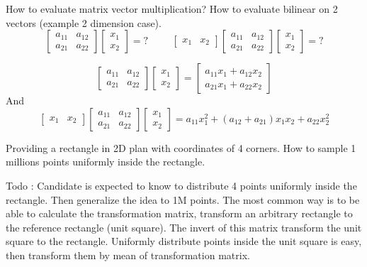 \documentclass[answers]{exam}
\begin{document}
\begin{questions}
\question How to evaluate matrix vector multiplication? How to evaluate bilinear on 2 vectors (example 2 dimension case).
\[
\left[ 
\begin{array}{cc}
a_{11} & a_{12}\\
a_{21} & a_{22}
\end{array} 
\right]
\left[ 
\begin{array}{c}
x_{1}\\
x_{2}
\end{array} 
\right]
=?
\hspace{1cm}
\left[ 
\begin{array}{cc}
x_{1} & x_{2}
\end{array} 
\right]
\left[ 
\begin{array}{cc}
a_{11} & a_{12}\\
a_{21} & a_{22}
\end{array} 
\right]
\left[ 
\begin{array}{c}
x_{1}\\
x_{2}
\end{array} 
\right]
=?
\]
\begin{solution}[.2in]
\[
\left[ 
\begin{array}{cc}
a_{11} & a_{12}\\
a_{21} & a_{22}
\end{array} 
\right]
\left[ 
\begin{array}{c}
x_{1}\\
x_{2}
\end{array} 
\right]
=
\left[ 
\begin{array}{c}
a_{11}x_1 + a_{12}x_2\\
a_{21}x_1 + a_{22}x_2
\end{array} 
\right]
\]
And
\[
\left[ 
\begin{array}{cc}
x_{1} & x_{2}
\end{array} 
\right]
\left[ 
\begin{array}{cc}
a_{11} & a_{12}\\
a_{21} & a_{22}
\end{array} 
\right]
\left[ 
\begin{array}{c}
x_{1}\\
x_{2}
\end{array} 
\right]
=
a_{11}x^2_1 + (a_{12}+a_{21})x_1x_2 + a_{22}x^2_2
\]
\end{solution}

\question Providing a rectangle in 2D plan with coordinates of 4 corners. How to sample 1 millions points uniformly inside the rectangle.
\begin{solution}[.2in]
Todo : Candidate is expected to know to distribute 4 points uniformly inside the rectangle. Then generalize the idea to 1M points. The most common way is to be able to calculate the transformation matrix, transform an arbitrary rectangle to the reference rectangle (unit square). The invert of this matrix transform the unit square to the rectangle. Uniformly distribute points inside the unit square is easy, then transform them by mean of transformation matrix.
\end{solution}


\end{questions}
\end{document}
